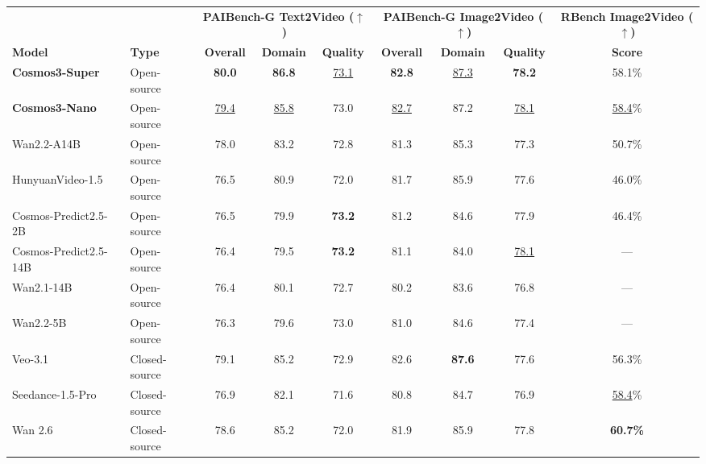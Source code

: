 \documentclass{llmxive}
\providecommand{\arraystretch}{1.5}
\begin{document}
\begin{table}[t]
    \centering
    \captionsetup{justification=raggedright, singlelinecheck=false}
    \footnotesize
    \setlength{\tabcolsep}{4pt}
    \renewcommand{\arraystretch}{1.15}
    \begin{tabular}{l l | ccc | ccc | c}
        \toprule
        & & \multicolumn{3}{c}{\textbf{PAIBench-G Text2Video ($\uparrow$)}} & \multicolumn{3}{c}{\textbf{PAIBench-G Image2Video ($\uparrow$)}} & \textbf{RBench Image2Video ($\uparrow$)} \\
        \cmidrule(lr){3-5} \cmidrule(lr){6-8} \cmidrule{9-9}
        \textbf{Model} & \textbf{Type} & \textbf{Overall} & \textbf{Domain} & \textbf{Quality} & \textbf{Overall} & \textbf{Domain} & \textbf{Quality} & \textbf{Score} \\
        \midrule
        \rowcolor{rowours}
        \textbf{Cosmos3-Super} & Open-source & \textbf{80.0} & \textbf{86.8} & \underline{73.1} & \textbf{82.8} & \underline{87.3} & \textbf{78.2} & 58.1\% \\
        \rowcolor{rowours}
        \textbf{Cosmos3-Nano}  & Open-source & \underline{79.4} & \underline{85.8} & 73.0 & \underline{82.7} & 87.2 & \underline{78.1} & \underline{58.4}\% \\
        \midrule
        Wan2.2-A14B                   & Open-source & 78.0 & 83.2 & 72.8 & 81.3 & 85.3 & 77.3 & 50.7\% \\
        HunyuanVideo-1.5              & Open-source & 76.5 & 80.9 & 72.0 & 81.7 & 85.9 & 77.6 & 46.0\% \\
        Cosmos-Predict2.5-2B   & Open-source & 76.5 & 79.9 & \textbf{73.2} & 81.2 & 84.6 & 77.9 & 46.4\% \\
        Cosmos-Predict2.5-14B  & Open-source & 76.4 & 79.5 & \textbf{73.2} & 81.1 & 84.0 & \underline{78.1} & ---  \\
        Wan2.1-14B                    & Open-source & 76.4 & 80.1 & 72.7 & 80.2 & 83.6 & 76.8 & ---  \\
        Wan2.2-5B                     & Open-source & 76.3 & 79.6 & 73.0 & 81.0 & 84.6 & 77.4 & ---  \\
        \midrule
        Veo-3.1                       & Closed-source   & 79.1 & 85.2 & 72.9 & 82.6 & \textbf{87.6} & 77.6 & 56.3\% \\
        Seedance-1.5-Pro              & Closed-source   & 76.9 & 82.1 & 71.6 & 80.8  & 84.7  & 76.9  & \underline{58.4}\% \\
        Wan 2.6                       & Closed-source & 78.6 & 85.2 & 72.0 & 81.9 & 85.9 & 77.8  & \textbf{60.7\%}\\

\end{tabular}
\end{table}
\end{document}
